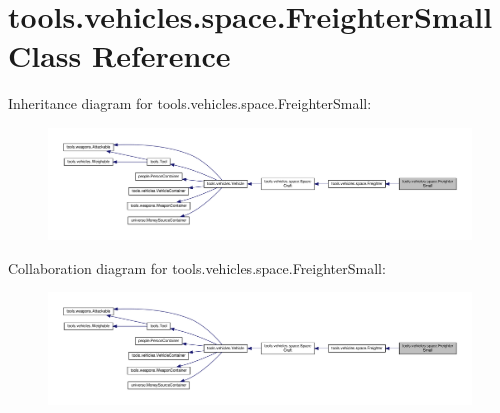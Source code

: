 \hypertarget{classtools_1_1vehicles_1_1space_1_1_freighter_small}{}\section{tools.\+vehicles.\+space.\+Freighter\+Small Class Reference}
\label{classtools_1_1vehicles_1_1space_1_1_freighter_small}


Inheritance diagram for tools.\+vehicles.\+space.\+Freighter\+Small\+:
\nopagebreak
\begin{figure}[H]
\begin{center}
\leavevmode
\includegraphics[width=350pt]{classtools_1_1vehicles_1_1space_1_1_freighter_small__inherit__graph}
\end{center}
\end{figure}


Collaboration diagram for tools.\+vehicles.\+space.\+Freighter\+Small\+:
\nopagebreak
\begin{figure}[H]
\begin{center}
\leavevmode
\includegraphics[width=350pt]{classtools_1_1vehicles_1_1space_1_1_freighter_small__coll__graph}
\end{center}
\end{figure}
